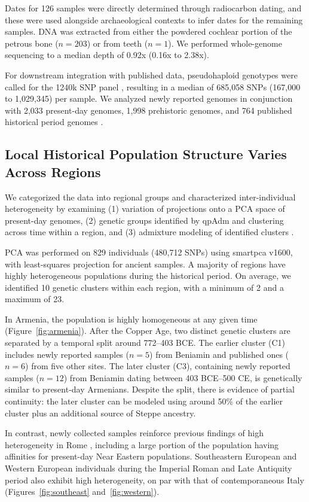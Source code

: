 \documentclass[11pt]{article}
\begin{document}
Dates for 126 samples were directly determined through radiocarbon dating, and these were used alongside archaeological contexts to infer dates for the remaining samples. DNA was extracted from either the powdered cochlear portion of the petrous bone ($n = 203$) or from teeth ($n = 1$). We performed whole-genome sequencing to a median depth of 0.92x (0.16x to 2.38x).

For downstream integration with published data, pseudohaploid genotypes were called for the 1240k SNP panel \citep{Mathieson2015}, resulting in a median of 685,058 SNPs (167,000 to 1,029,345) per sample. We analyzed newly reported genomes in conjunction with 2,033 present-day genomes, 1,998 prehistoric genomes, and 764 published historical period genomes \citep{Clemente2021,Mallick2020,Saupe2021}.

\subsection{Local Historical Population Structure Varies Across Regions}

We categorized the data into regional groups and characterized inter-individual heterogeneity by examining (1) variation of projections onto a PCA space of present-day genomes, (2) genetic groups identified by qpAdm and clustering across time within a region, and (3) admixture modeling of identified clusters \citep{Haak2015,Harney2021}.

PCA was performed on 829 individuals (480,712 SNPs) using smartpca v1600, with least-squares projection for ancient samples. A majority of regions have highly heterogeneous populations during the historical period. On average, we identified 10 genetic clusters within each region, with a minimum of 2 and a maximum of 23.

In Armenia, the population is highly homogeneous at any given time (Figure~\ref{fig:armenia}). After the Copper Age, two distinct genetic clusters are separated by a temporal split around 772--403 BCE. The earlier cluster (C1) includes newly reported samples ($n=5$) from Beniamin and published ones ($n=6$) from five other sites. The later cluster (C3), containing newly reported samples ($n=12$) from Beniamin dating between 403 BCE--500 CE, is genetically similar to present-day Armenians. Despite the split, there is evidence of partial continuity: the later cluster can be modeled using around 50\% of the earlier cluster plus an additional source of Steppe ancestry.

In contrast, newly collected samples reinforce previous findings of high heterogeneity in Rome \citep{Antonio2019,Posth2021}, including a large portion of the population having affinities for present-day Near Eastern populations. Southeastern European and Western European individuals during the Imperial Roman and Late Antiquity period also exhibit high heterogeneity, on par with that of contemporaneous Italy (Figures~\ref{fig:southeast} and~\ref{fig:western}).
\end{document}
